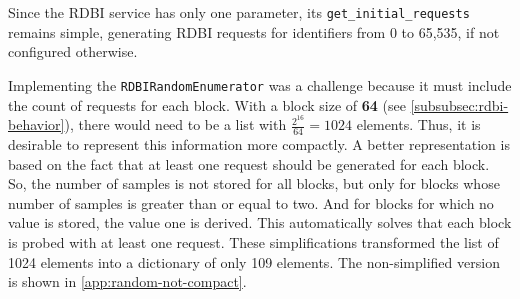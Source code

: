 Since the RDBI service has only one parameter, its \texttt{get_initial_requests} remains simple, generating RDBI requests for identifiers from 0 to 65,535, if not configured otherwise.

Implementing the \texttt{RDBIRandomEnumerator} was a challenge because it must include the count of requests for each block. With a block size of \textbf{64} (see \autoref{subsubsec:rdbi-behavior}), there would need to be a list with $\frac{2^{16}}{64} = 1024$ elements. Thus, it is desirable to represent this information more compactly. A better representation is based on the fact that at least one request should be generated for each block. So, the number of samples is not stored for all blocks, but only for blocks whose number of samples is greater than or equal to two. And for blocks for which no value is stored, the value one is derived. This automatically solves that each block is probed with at least one request. These simplifications transformed the list of 1024 elements into a dictionary of only 109 elements. The non-simplified version is shown in \autoref{app:random-not-compact}.


